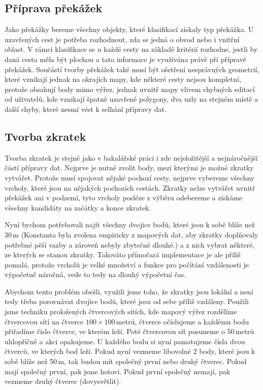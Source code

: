 \subsection{Příprava překážek}
Jako překážky bereme všechny objekty, které klasifikací získaly typ překážka.
U uzavřených cest je potřeba rozhodnout, zda se jedná o obvod nebo i vnitřní
oblast. V rámci klasifikace se u každé cesty na základě kritérií rozhodne,
jestli by daná cesta měla být plochou a tato informace je využívána právě při
přípravě překážek. Součástí tvorby překážek také musí být ošetření nesprávných
geometrií, které vznikají jednak na okrajích mapy, kde některé cesty nejsou
kompletní, protože obsahují body mimo výřez, jednak uvnitř mapy vlivem chybných
editací od uživatelů, kde vznikají špatně uzavřené polygony, dva uzly na stejném
místě a další chyby, které nesmí vést k selhání přípravy dat.

\subsection{Tvorba zkratek}
Tvorba zkratek je stejně jako v bakalářské práci i zde nejsložitější a
nejnáročnější částí přípravy dat. Nejprve je nutné zvolit body, mezi kterými je
možné zkratky vytvářet. Protože musí spojovat nějaké pochozí cesty, nejprve
vybereme všechny vrcholy, které jsou na nějakých pochozích cestách. Zkratky
nelze vytvářet uvnitř překážek ani v podzemí, tyto vrcholy posléze z výběru
odebereme a získáme všechny kandidáty na začátky a konce zkratek. 

Nyní bychom potřebovali najít všechny dvojice bodů, které jsou k sobě blíže než
30\,m (Konstanta byla zvolena empiricky z mapových dat, aby zkratky doplňovaly
potřebné pěší vazby a zároveň nebyly zbytečně dlouhé.) a z nich vybrat některé,
ze kterých se stanou zkratky. Takováto přímočará implementace je ale příliš
pomalá, protože vrcholů je velké množství a funkce pro počítání vzdálenosti je
výpočetně náročná, vede to tedy na dlouhý výpočetní čas.

Abychom tento problém obešli, využili jsme toho, že zkratky jsou lokální a není
tedy třeba porovnávat dvojice bodů, které jsou od sebe příliš vzdáleny. Použili
jsme techniku proložených čtvercových sítích, kde mapový výřez rozdělíme
čtvercovou sítí na čtverce $100\times100$\,metrů, čtverce očíslujeme a každému
bodu přiřadíme číslo čtverce, ve kterém leží. Poté čtvercovou síť posuneme o
50\,metrů uhlopříčně a akci opakujeme. U každého bodu si nyní pamatujeme čísla
dvou čtverců, ve kterých bod leží. Pokud nyní vezmeme libovolné 2 body, které
jsou k sobě blíže než 50\,m, tak budou mít společný první nebo druhý čtverec.
Pokud mají společný první, pak jsme hotovi. Pokud první společný nemají, pak
vezmeme druhý čtverec (\TODO dovysvětlit).

